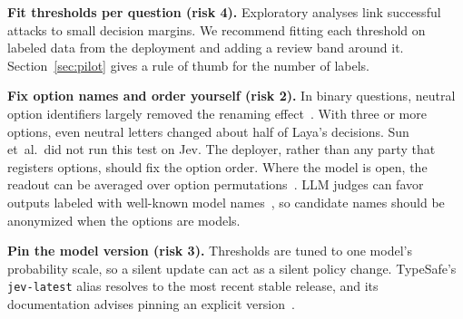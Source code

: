 \noindent\textbf{Fit thresholds per question (risk 4).} Exploratory analyses link successful attacks to small decision margins. We recommend fitting each threshold on labeled data from the deployment and adding a review band around it. Section~\ref{sec:pilot} gives a rule of thumb for the number of labels.

\noindent\textbf{Fix option names and order yourself (risk 2).} In binary questions, neutral option identifiers largely removed the renaming effect~\cite{sun2026type}. With three or more options, even neutral letters changed about half of Laya's decisions. Sun et~al.\ did not run this test on Jev. The deployer, rather than any party that registers options, should fix the option order. Where the model is open, the readout can be averaged over option permutations~\cite{zheng2024large}. LLM judges can favor outputs labeled with well-known model names~\cite{gu2024survey}, so candidate names should be anonymized when the options are models.

\noindent\textbf{Pin the model version (risk 3).} Thresholds are tuned to one model's probability scale, so a silent update can act as a silent policy change. TypeSafe's \texttt{jev-latest} alias resolves to the most recent stable release, and its documentation advises pinning an explicit version~\cite{typesafe2026docs}.
